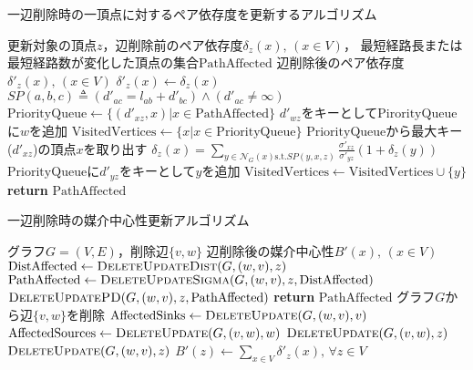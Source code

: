 \begin{algorithm}[H]
  \caption{一辺削除時の一頂点に対するペア依存度を更新するアルゴリズム}
  \label{algo:update-pd-on-delete}
  \begin{algorithmic}[1]
    \Require 更新対象の頂点$z$，辺削除前のペア依存度$\delta_z(x),\,(x\in V)$，
    最短経路長または最短経路数が変化した頂点の集合$\mathrm{PathAffected}$
    \Ensure 辺削除後のペア依存度$\delta'_z(x),\,(x\in V)$
    \State $\delta'_z(x)\gets\delta_z(x)$
    \State $SP(a,b,c)\triangleq(d'_{ac}=l_{ab}+d'_{bc})\land(d'_{ac}\neq\infty)$
    \State $\mathrm{PriorityQueue}\gets\{(d'_{xz},x)|x\in\mathrm{PathAffected}\}$
    \State $d'_{wz}$をキーとして$\mathrm{PirorityQueue}$に$w$を追加
    \EndIf
    \State $\mathrm{VisitedVertices}\gets\{x|x\in\mathrm{PriorityQueue}\}$
    \State $\mathrm{PriorityQueue}$から最大キー($d'_{xz}$)の頂点$x$を取り出す
    \State $\delta_z(x)=\sum_{y\in\mathcal{N}_G(x)\mathrm{s.t.}SP(y,x,z)}\frac{\sigma'_{xz}}{\sigma'_{yz}}(1+\delta_z(y))$
    \State $\mathrm{PriorityQueue}$に$d'_{yz}$をキーとして$y$を追加
    \State $\mathrm{VisitedVertices}\gets\mathrm{VisitedVertices}\cup\{y\}$
    \EndFor
    \EndIf
    \EndWhile
    \State \textbf{return} $\mathrm{PathAffected}$
    \EndProcedure
  \end{algorithmic}
\end{algorithm}

\begin{algorithm}[H]
  \caption{一辺削除時の媒介中心性更新アルゴリズム}
  \label{algo:update-bc-on-delete}
  \begin{algorithmic}[1]
    \Require グラフ$G=(V,E)$，削除辺$\{v,w\}$
    \Ensure 辺削除後の媒介中心性$B'(x),\,(x\in V)$
    \State $\mathrm{DistAffected}\gets\textproc{DeleteUpdateDist}(G,(w,v),z)$
    \State $\mathrm{PathAffected}\gets\textproc{DeleteUpdateSigma}(G,(w,v),z,\mathrm{DistAffected})$
    \State $\textproc{DeleteUpdatePD}(G,(w,v),z,\mathrm{PathAffected})$
    \State \textbf{return} $\mathrm{PathAffected}$
    \EndProcedure
    \State グラフ$G$から辺$\{v,w\}$を削除
    \State $\mathrm{AffectedSinks}\gets\textproc{DeleteUpdate}(G,(w,v),v)$
    \State $\mathrm{AffectedSources}\gets\textproc{DeleteUpdate}(G,(v,w),w)$
    \State $\textproc{DeleteUpdate}(G,(v,w),z)$
    \EndFor
    \State $\textproc{DeleteUpdate}(G,(w,v),z)$
    \EndFor
    \State $B'(z)\gets\sum_{x\in V}\delta'_z(x),\,\forall z\in V$
  \end{algorithmic}
\end{algorithm}
